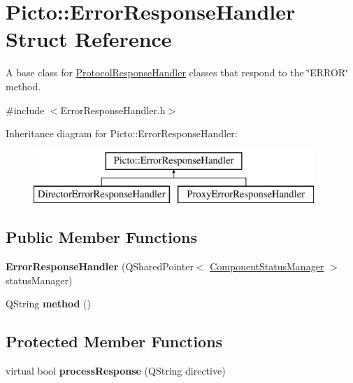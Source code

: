 \hypertarget{struct_picto_1_1_error_response_handler}{\section{Picto\-:\-:Error\-Response\-Handler Struct Reference}
\label{struct_picto_1_1_error_response_handler}
}


A base class for \hyperlink{struct_picto_1_1_protocol_response_handler}{Protocol\-Response\-Handler} classes that respond to the \char`\"{}\-E\-R\-R\-O\-R\char`\"{} method.  




{\ttfamily \#include $<$Error\-Response\-Handler.\-h$>$}

Inheritance diagram for Picto\-:\-:Error\-Response\-Handler\-:\begin{figure}[H]
\begin{center}
\leavevmode
\includegraphics[height=2.000000cm]{struct_picto_1_1_error_response_handler}
\end{center}
\end{figure}
\subsection*{Public Member Functions}
\begin{DoxyCompactItemize}
\item 
\hypertarget{struct_picto_1_1_error_response_handler_adba6f2845b9fc06d897f54193abea905}{{\bfseries Error\-Response\-Handler} (Q\-Shared\-Pointer$<$ \hyperlink{class_component_status_manager}{Component\-Status\-Manager} $>$ status\-Manager)}\label{struct_picto_1_1_error_response_handler_adba6f2845b9fc06d897f54193abea905}

\item 
\hypertarget{struct_picto_1_1_error_response_handler_a8faf18da6f2c8a79fbe57912894687cc}{Q\-String {\bfseries method} ()}\label{struct_picto_1_1_error_response_handler_a8faf18da6f2c8a79fbe57912894687cc}

\end{DoxyCompactItemize}
\subsection*{Protected Member Functions}
\begin{DoxyCompactItemize}
\item 
\hypertarget{struct_picto_1_1_error_response_handler_a993ee7e95ab44ca4699243f9d609c04f}{virtual bool {\bfseries process\-Response} (Q\-String directive)}\label{struct_picto_1_1_error_response_handler_a993ee7e95ab44ca4699243f9d609c04f}

\end{DoxyCompactItemize}


